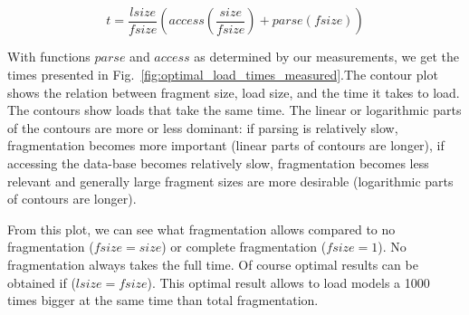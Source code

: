$$t=\frac{lsize}{fsize}\left(access(\frac{size}{fsize}) + parse(fsize)\right)$$

With functions $parse$ and $access$ as determined by our measurements, we get the times presented in Fig.~\ref{fig:optimal_load_times_measured}.The contour plot shows the relation between fragment size, load size, and the time it takes to load. The contours show loads that take the same time. The linear or logarithmic parts of the contours are more or less dominant: if parsing is relatively slow, fragmentation becomes more important (linear parts of contours are longer), if accessing the data-base becomes relatively slow, fragmentation becomes less relevant and generally large fragment sizes are more desirable (logarithmic parts of contours are longer).

From this plot, we can see what fragmentation allows compared to no fragmentation ($fsize=size$) or complete fragmentation ($fsize=1$). No fragmentation always takes the full time. Of course optimal results can be obtained if ($lsize=fsize$). This optimal result allows to load models a 1000 times bigger at the same time than total fragmentation. 

